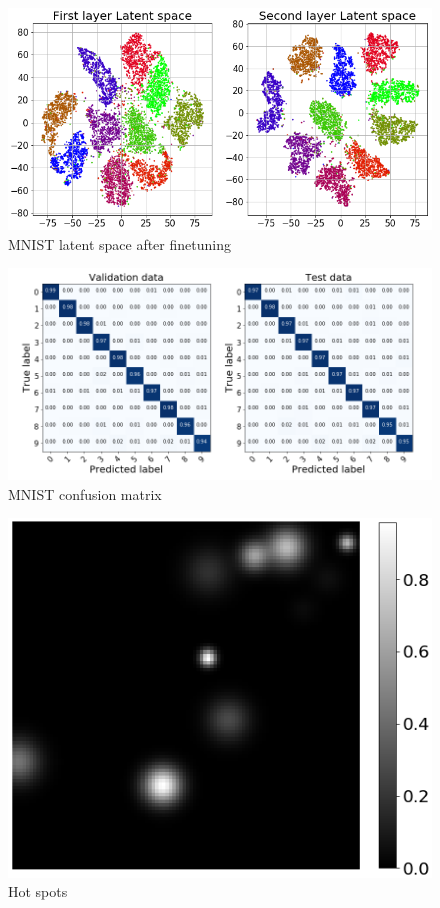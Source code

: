 \documentclass{article}
\begin{document}
\begin{figure}[!h]
	\centering
	\includegraphics[width=1\linewidth]{figures_3/latent_space_finetune_no_legend.png}  
	\caption{MNIST latent space after finetuning}
\end{figure}


\begin{figure}[!h]
	\includegraphics[width=1\linewidth]{figures_3/Confusion_matrix_fine_tune.png}  
	\caption{MNIST confusion matrix}
\end{figure}

\begin{figure}[!h]
    \centering
	\includegraphics[width=0.5\linewidth]{figures_3/raman_sim_hotspots.png}  
	\caption{Hot spots}
\end{figure}
\end{document}
